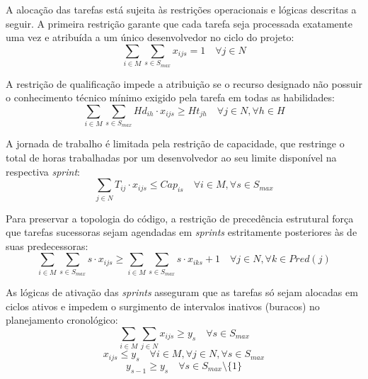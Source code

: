 \documentclass[a4paper,11pt]{article}
\begin{document}
A alocação das tarefas está sujeita às restrições operacionais e lógicas 
descritas a seguir. A primeira restrição garante que cada tarefa seja processada 
exatamente uma vez e atribuída a um único desenvolvedor no ciclo do projeto:
\begin{equation}
    \sum_{i \in M} \sum_{s \in S_{max}} x_{ijs} = 1 \quad \forall j \in N
\end{equation}

A restrição de qualificação impede a atribuição se o recurso designado não 
possuir o conhecimento técnico mínimo exigido pela tarefa em todas as habilidades:
\begin{equation}
    \sum_{i \in M} \sum_{s \in S_{max}} Hd_{ih} \cdot x_{ijs} \ge Ht_{jh} \quad \forall j \in N, \forall h \in H
\end{equation}

A jornada de trabalho é limitada pela restrição de capacidade, que restringe 
o total de horas trabalhadas por um desenvolvedor ao seu limite 
disponível na respectiva \textit{sprint}:
\begin{equation}
    \sum_{j \in N} T_{ij} \cdot x_{ijs} \le Cap_{is} \quad \forall i \in M, \forall s \in S_{max}
\end{equation}

Para preservar a topologia do código, a restrição de precedência estrutural força 
que tarefas sucessoras sejam agendadas em \textit{sprints} estritamente 
posteriores às de suas predecessoras:
\begin{equation}
    \sum_{i \in M} \sum_{s \in S_{max}} s \cdot x_{ijs} \ge \sum_{i \in M} \sum_{s \in S_{max}} s \cdot x_{iks} + 1 \quad \forall j \in N, \forall k \in Pred(j)
\end{equation}

As lógicas de ativação das \textit{sprints} asseguram que as tarefas só sejam 
alocadas em ciclos ativos e impedem o surgimento de intervalos inativos 
(buracos) no planejamento cronológico:
\begin{equation}
    \sum_{i \in M}\sum_{j \in N} x_{ijs} \ge y_s \quad \forall s \in S_{max}
\end{equation}
\begin{equation}
    x_{ijs} \le y_s \quad \forall i \in M, \forall j \in N, \forall s \in S_{max}
\end{equation}
\begin{equation}
    y_{s-1} \ge y_s \quad \forall s \in S_{max} \setminus \{1\}
\end{equation}
\end{document}
